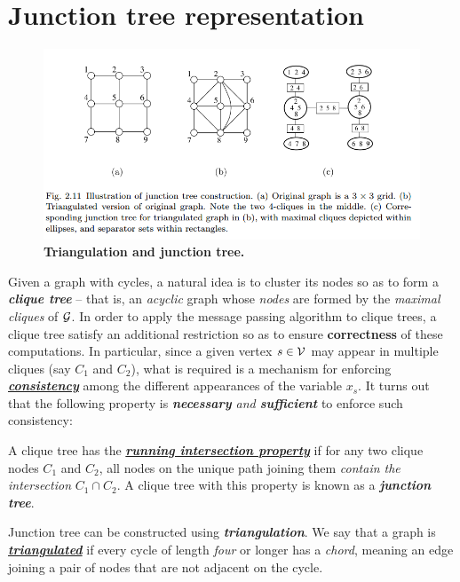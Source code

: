 \documentclass[11pt]{article}
\begin{document}
\section{Junction tree representation}
\begin{figure}
\begin{minipage}[t]{1\linewidth}
  \centering
  \centerline{\includegraphics[scale = 0.5]{triangulation_junction_tree.png}}
\end{minipage}
\caption{\footnotesize{\textbf{Triangulation and junction tree. \citep{wainwright2008graphical}}}}
\label{fig: triangulation_junction_tree}
\end{figure}
Given a graph with cycles, a natural idea is to cluster its nodes so as to form a \emph{\textbf{clique tree}} -- that is, an \emph{acyclic} graph whose \emph{nodes} are formed by the \emph{maximal cliques} of ${\mathcal G}$. In order to apply the message passing algorithm to clique trees, a clique tree satisfy an additional restriction so as to ensure \textbf{correctness} of these computations.  In particular, since a given vertex $s \in {\mathcal V}$ may appear in multiple cliques (say $C_1$ and $C_2$), what is required is a mechanism for enforcing \underline{\textbf{\emph{consistency}}} among the different appearances of the variable $x_s$. It turns out that the following property is \emph{\textbf{necessary} and \textbf{sufficient}} to enforce such consistency:
\begin{definition}
A clique tree has the \underline{\textbf{\emph{running intersection property}}} if for any two clique nodes $C_1$ and $C_2$, all nodes on the unique path joining them \emph{contain the intersection} $C_1 \cap C_2$. A clique tree with this property is known as a \emph{\textbf{junction tree}}.
\end{definition}

Junction tree can be constructed using \emph{\textbf{triangulation}}. We say that a graph is \underline{\emph{\textbf{triangulated}}} if every cycle of length \emph{four} or longer has a \emph{chord}, meaning an edge joining a pair of nodes that are not adjacent on the cycle.  
\end{document}
